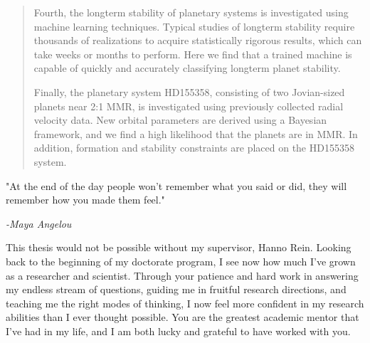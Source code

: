 \documentclass[letterpaper]{ut-thesis} %
\begin{document}
\begin{preliminary}
\begin{abstract}
Fourth, the longterm stability of planetary systems is investigated using machine learning techniques.
Typical studies of longterm stability require thousands of realizations to acquire statistically rigorous results, which can take weeks or months to perform. 
Here we find that a trained machine is capable of quickly and accurately classifying longterm planet stability. 
 
Finally, the planetary system HD155358, consisting of two Jovian-sized planets near 2:1 MMR, is investigated using previously collected radial velocity data. 
New orbital parameters are derived using a Bayesian framework, and we find a high likelihood that the planets are in MMR.
In addition, formation and stability constraints are placed on the HD155358 system.
 
\end{abstract}
\cleardoublepage



\vspace*{\fill}
\begin{center}
\begin{minipage}[c]{4.75in}
 "At the end of the day people won't remember what you said or did, they will remember how you made them feel." \vspace{1em}
 
\hfill \emph{-Maya Angelou}


\end{minipage}
\end{center}
\vspace*{\fill}

\cleardoublepage

\begin{acknowledgements}
This thesis would not be possible without my supervisor, Hanno Rein. 
Looking back to the beginning of my doctorate program, I see now how much I've grown as a researcher and scientist.
Through your patience and hard work in answering my endless stream of questions, guiding me in fruitful research directions, and teaching me the right modes of thinking, I now feel more confident in my research abilities than I ever thought possible. 
You are the greatest academic mentor that I've had in my life, and I am both lucky and grateful to have worked with you. 


\end{acknowledgements}
\end{preliminary}
\end{document}
